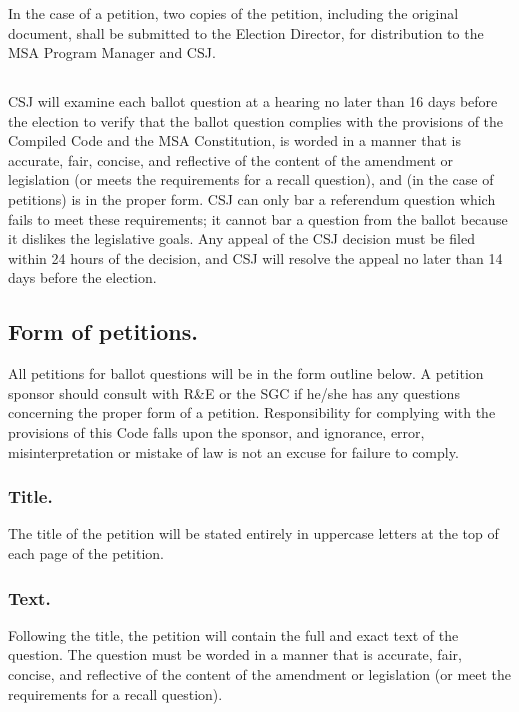 \subsubsection{}
In the case of a petition, two copies of the petition, including the original document, shall be submitted to the Election Director, for distribution to the MSA Program Manager and CSJ.

\subsection{}
CSJ will examine each ballot question at a hearing no later than 16 days before the election to verify that the ballot question complies with the provisions of the Compiled Code and the MSA Constitution, is worded in a manner that is accurate, fair, concise, and reflective of the content of the amendment or legislation (or meets the requirements for a recall question), and (in the case of petitions) is in the proper form. CSJ can only bar a referendum question which fails to meet these requirements; it cannot bar a question from the ballot because it dislikes the legislative goals. Any appeal of the CSJ decision must be filed within 24 hours of the decision, and CSJ will resolve the appeal no later than 14 days before the election.

\subsection{Form of petitions.}
All petitions for ballot questions will be in the form outline below.  A petition sponsor should consult with R\&E or the SGC if he/she has any questions concerning the proper form of a petition.  Responsibility for complying with the provisions of this Code falls upon the sponsor, and ignorance, error, misinterpretation or mistake of law is not an excuse for failure to comply.
\subsubsection{Title.}
The title of the petition will be stated entirely in uppercase letters at the top of each page of the petition.
\subsubsection{Text.}
Following the title, the petition will contain the full and exact text of the question. The question must be worded in a manner that is accurate, fair, concise, and reflective of the content of the amendment or legislation (or meet the requirements for a recall question).

